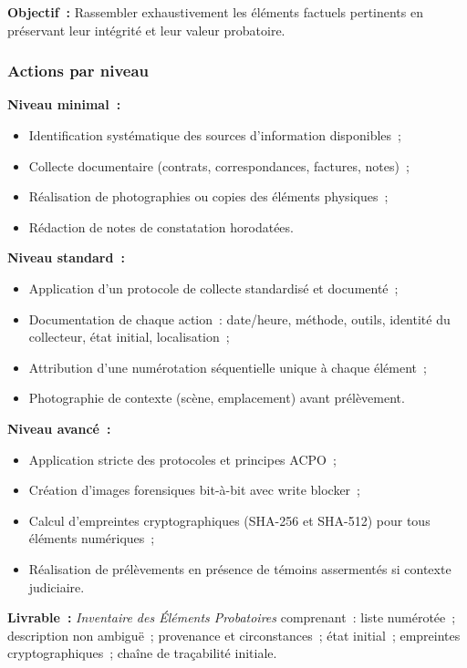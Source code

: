 \textbf{Objectif~:} Rassembler exhaustivement les éléments factuels pertinents
en préservant leur intégrité et leur valeur probatoire.

\subsubsection*{Actions par niveau}

\textbf{Niveau minimal~:}
\begin{itemize}
    \item Identification systématique des sources d'information disponibles~;
    \item Collecte documentaire (contrats, correspondances, factures, notes)~;
    \item Réalisation de photographies ou copies des éléments physiques~;
    \item Rédaction de notes de constatation horodatées.
\end{itemize}

\textbf{Niveau standard~:}
\begin{itemize}
    \item Application d'un protocole de collecte standardisé et documenté~;
    \item Documentation de chaque action~: date/heure, méthode, outils,
          identité du collecteur, état initial, localisation~;
    \item Attribution d'une numérotation séquentielle unique à chaque élément~;
    \item Photographie de contexte (scène, emplacement) avant prélèvement.
\end{itemize}

\textbf{Niveau avancé~:}
\begin{itemize}
    \item Application stricte des protocoles  et
          principes ACPO~;
    \item Création d'images forensiques bit-à-bit avec write blocker~;
    \item Calcul d'empreintes cryptographiques (SHA-256 et SHA-512) pour
          tous éléments numériques~;
    \item Réalisation de prélèvements en présence de témoins assermentés
          si contexte judiciaire.
\end{itemize}

\textbf{Livrable~:} \textit{Inventaire des Éléments Probatoires} comprenant~:
liste numérotée~; description non ambiguë~; provenance et circonstances~;
état initial~; empreintes cryptographiques~; chaîne de traçabilité initiale.

